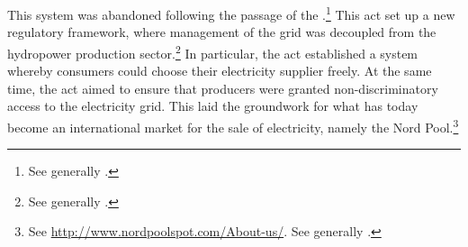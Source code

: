 
This system was abandoned following the passage of the \cite{ea90}.\footnote{See generally \cite{bibow11}.} This act set up a new regulatory framework, where management of the grid was decoupled from the hydropower production sector.\footnote{See generally \cite{bye05}.} In particular, the act established a system whereby consumers could choose their electricity supplier freely. At the same time, the act aimed to ensure that producers were granted non-discriminatory access to the electricity grid. This laid the groundwork for what has today become an international market for the sale of electricity, namely the Nord Pool.\footnote{See \url{http://www.nordpoolspot.com/About-us/}. See generally \cite{skjold07,galtung07}.}

